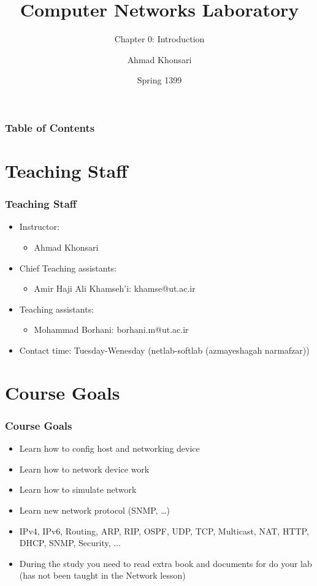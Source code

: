 \documentclass[15pt]{beamer}
\title{Computer Networks Laboratory}
\subtitle{Chapter 0: Introduction}
\author{Ahmad Khonsari}
\institute{
    ECE Department\\
    Tehran University \newline
    \url{http://ece.ut.ac.ir/portal/}
}
\date{Spring 1399}
\begin{document}
\frame{\titlepage}

\begin{frame}
    \frametitle{Table of Contents}
    \tableofcontents
\end{frame}

\section{Teaching Staff}
\begin{frame}
\frametitle{Teaching Staff}
\begin{itemize}
    \item Instructor:
    \begin{itemize}
        \item Ahmad Khonsari
    \end{itemize}
    \item Chief Teaching assistants:
    \begin{itemize}
        \item Amir Haji Ali Khamseh’i: khamse@ut.ac.ir
    \end{itemize}
    \item Teaching assistants:
    \begin{itemize}
        \item Mohammad Borhani: borhani.m@ut.ac.ir
    \end{itemize}
    \item Contact time: Tuesday-Wenesday (netlab-softlab (azmayeshagah narmafzar))
\end{itemize}

\end{frame}

\section{Course Goals}
\begin{frame}
    \frametitle{Course Goals}

    \begin{itemize}
        \item Learn how to config host and networking device
        \item Learn how to network device work
        \item Learn how to simulate network
        \item Learn new network protocol (SNMP, \dots)
        \item IPv4, IPv6, Routing, ARP, RIP, OSPF, UDP, TCP, Multicast, NAT, HTTP, DHCP, SNMP, Security, ...         
        \item During the study you need to read extra book and documents for do your lab (has not been taught in the Network lesson)
    \end{itemize}

\end{frame}
\end{document}
